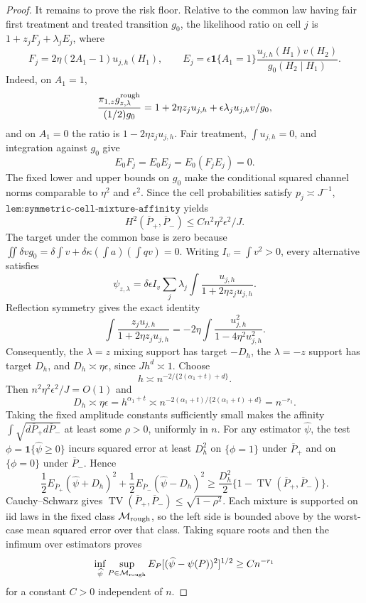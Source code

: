 \documentclass{article}
\begin{document}
\begin{proof}
It remains to prove the risk floor. Relative to the common law having fair first treatment and treated transition \(g_0\), the likelihood ratio on cell \(j\) is \(1+z_jF_j+\lambda_jE_j\), where
\[
F_j=2\eta(2A_1-1)u_{j,h}(H_1),\qquad E_j=\epsilon\mathbf 1\{A_1=1\}\frac{u_{j,h}(H_1)v(H_2)}{g_0(H_2\mid H_1)}.
\]
Indeed, on \(A_1=1\),
\[
\frac{\pi_{1,z}g^{\rm rough}_{z,\lambda}}{(1/2)g_0}=1+2\eta z_j u_{j,h}+\epsilon\lambda_j u_{j,h}v/g_0,
\]
and on \(A_1=0\) the ratio is \(1-2\eta z_ju_{j,h}\). Fair treatment, \(\int u_{j,h}=0\), and integration against \(g_0\) give
\[
E_0F_j=E_0E_j=E_0(F_jE_j)=0.
\]
The fixed lower and upper bounds on \(g_0\) make the conditional squared channel norms comparable to \(\eta^2\) and \(\epsilon^2\). Since the cell probabilities satisfy \(p_j\asymp J^{-1}\), \(\texttt{lem:symmetric-cell-mixture-affinity}\) yields
\[
H^2(\overline P_+,\overline P_-)\le C n^2\eta^2\epsilon^2/J.
\]
The target under the common base is zero because \(\iint\delta v g_0=\delta\int v+\delta\kappa(\int a)(\int qv)=0\). Writing \(I_v=\int v^2>0\), every alternative satisfies
\[
\psi_{z,\lambda}=\delta\epsilon I_v\sum_j\lambda_j\int\frac{u_{j,h}}{1+2\eta z_j u_{j,h}}.
\]
Reflection symmetry gives the exact identity
\[
\int\frac{z_j u_{j,h}}{1+2\eta z_j u_{j,h}}=-2\eta\int\frac{u_{j,h}^2}{1-4\eta^2u_{j,h}^2}.
\]
Consequently, the \(\lambda=z\) mixing support has target \(-D_h\), the \(\lambda=-z\) support has target \(D_h\), and \(D_h\asymp\eta\epsilon\), since \(J h^d\asymp1\). Choose
\[
h\asymp n^{-2/\{2(\alpha_1+t)+d\}}.
\]
Then \(n^2\eta^2\epsilon^2/J=O(1)\) and
\[
D_h\asymp\eta\epsilon=h^{\alpha_1+t}\asymp n^{-2(\alpha_1+t)/\{2(\alpha_1+t)+d\}}=n^{-r_1}.
\]
Taking the fixed amplitude constants sufficiently small makes the affinity \(\int\sqrt{d\overline P_+d\overline P_-}\) at least some \(\rho>0\), uniformly in \(n\). For any estimator \(\widehat\psi\), the test \(\phi=\mathbf 1\{\widehat\psi\ge0\}\) incurs squared error at least \(D_h^2\) on \(\{\phi=1\}\) under \(\overline P_+\) and on \(\{\phi=0\}\) under \(\overline P_-\). Hence
\[
\frac12E_{\overline P_+}(\widehat\psi+D_h)^2+\frac12E_{\overline P_-}(\widehat\psi-D_h)^2\ge\frac{D_h^2}{2}\{1-\operatorname{TV}(\overline P_+,\overline P_-)\}.
\]
Cauchy--Schwarz gives \(\operatorname{TV}(\overline P_+,\overline P_-)\le\sqrt{1-\rho^2}\). Each mixture is supported on iid laws in the fixed class \(\mathcal M_{\rm rough}\), so the left side is bounded above by the worst-case mean squared error over that class. Taking square roots and then the infimum over estimators proves
\[
\inf_{\widehat\psi}\sup_{P\in\mathcal M_{\rm rough}}E_P[(\widehat\psi-\psi(P))^2]^{1/2}\ge Cn^{-r_1}
\]
for a constant \(C>0\) independent of \(n\).
\end{proof}
\end{document}
